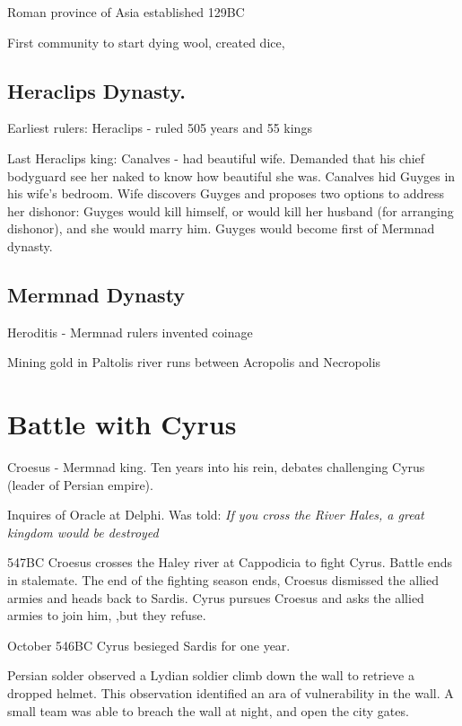 \documentclass[
]{book}
\begin{document}
Roman province of Asia established 129BC

First community to start dying wool, created dice,

\hypertarget{heraclips-dynasty.}{%
\subsection{Heraclips Dynasty.}\label{heraclips-dynasty.}}

Earliest rulers: Heraclips - ruled 505 years and 55 kings

Last Heraclips king: Canalves - had beautiful wife. Demanded that his chief bodyguard see her naked to know how beautiful she was. Canalves hid Guyges in his wife's bedroom. Wife discovers Guyges and proposes two options to address her dishonor: Guyges would kill himself, or would kill her husband (for arranging dishonor), and she would marry him. Guyges would become first of Mermnad dynasty.

\hypertarget{mermnad-dynasty}{%
\subsection{Mermnad Dynasty}\label{mermnad-dynasty}}

Heroditis - Mermnad rulers invented coinage

Mining gold in Paltolis river runs between Acropolis and Necropolis

\hypertarget{battle-with-cyrus}{%
\section{Battle with Cyrus}\label{battle-with-cyrus}}

Croesus - Mermnad king. Ten years into his rein, debates challenging Cyrus (leader of Persian empire).

Inquires of Oracle at Delphi. Was told: \emph{If you cross the River Hales, a great kingdom would be destroyed}

547BC Croesus crosses the Haley river at Cappodicia to fight Cyrus. Battle ends in stalemate. The end of the fighting season ends, Croesus dismissed the allied armies and heads back to Sardis. Cyrus pursues Croesus and asks the allied armies to join him, ,but they refuse.

October 546BC Cyrus besieged Sardis for one year.

Persian solder observed a Lydian soldier climb down the wall to retrieve a dropped helmet. This observation identified an ara of vulnerability in the wall. A small team was able to breach the wall at night, and open the city gates.
\end{document}
